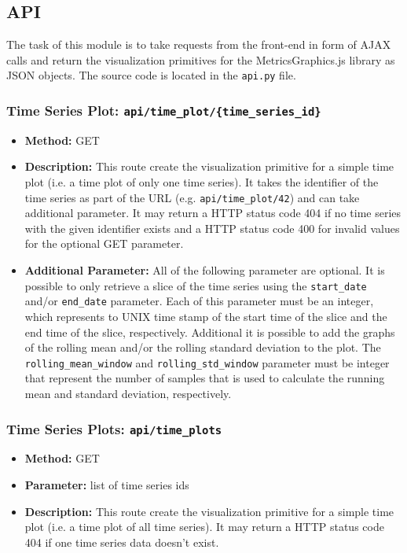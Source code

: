 \documentclass[11pt, a4paper]{article}
\begin{document}
\subsection{API}
The task of this module is to take requests from the front-end in form of AJAX calls and return the visualization primitives for the MetricsGraphics.js library as JSON objects.
The source code is located in the \texttt{api.py} file.

\subsubsection*{Time Series Plot: \texttt{api/time\_plot/\{time\_series\_id\}}}
\begin{itemize}
 \item[] \textbf{Method:} GET 
 \item[] \textbf{Description:} This route create the visualization primitive for a simple time plot (i.e. a time plot of only one time series).
 It takes the identifier of the time series as part of the URL (e.g. \texttt{api/time\_plot/42}) and can take additional parameter.
 It may return a HTTP status code 404 if no time series with the given identifier exists and a HTTP status code 400 for invalid values for the optional GET parameter.
 \item[] \textbf{Additional Parameter:} All of the following parameter are optional.
 It is possible to only retrieve a slice of the time series using the \texttt{start\_date} and/or \texttt{end\_date} parameter.
 Each of this parameter must be an integer, which represents to UNIX time stamp of the start time of the slice and the end time of the slice, respectively. 
 Additional it is possible to add the graphs of the rolling mean and/or the rolling standard deviation to the plot.
 The \texttt{rolling\_mean\_window} and \texttt{rolling\_std\_window} parameter must be integer that represent the number of samples that is used to calculate the running mean and standard deviation, respectively.
\end{itemize}


\subsubsection*{Time Series Plots: \texttt{api/time\_plots}}
\begin{itemize}
 \item[] \textbf{Method:} GET 
 \item[] \textbf{Parameter:} list of time series ids
 \item[] \textbf{Description:} This route create the visualization primitive for a simple time plot (i.e. a time plot of all time series).
 It may return a HTTP status code 404 if one time series data doesn't exist.
\end{itemize}
\end{document}
